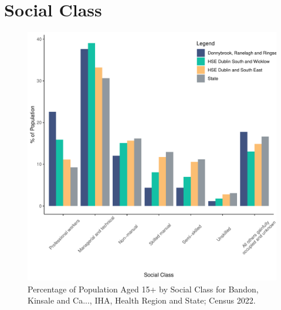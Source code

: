 \documentclass{article}
\begin{document}
\section{Social Class}\label{sect:SC}
\begin{figure}[H]
	\centering
	\includegraphics[width = 140mm]{../figures/SocialClassED.pdf}
	\caption{Percentage of Population Aged 15+ by Social Class for Bandon, Kinsale and Ca..., IHA, Health Region and State; Census 2022.}
	\label{fig:vbnv}
	\end{figure}
\end{document}
